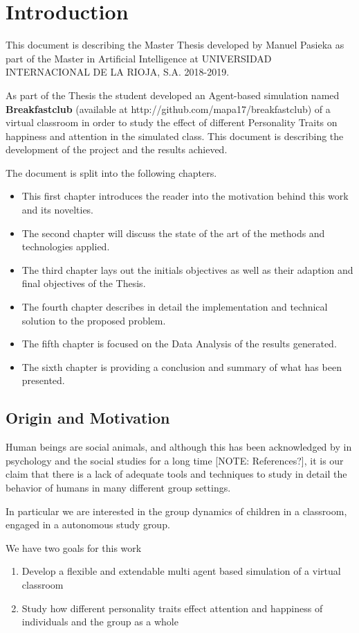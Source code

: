 \chapter{Introduction}
This document is describing the Master Thesis developed by Manuel Pasieka as part
of the Master in Artificial Intelligence at UNIVERSIDAD INTERNACIONAL DE LA RIOJA, S.A.
2018-2019. \par

\bb

As part of the Thesis the student developed an Agent-based simulation named
\textbf{Breakfastclub} (available at http://github.com/mapa17/breakfastclub) of a virtual classroom in order to study the effect of
different Personality Traits on happiness and attention in the simulated class.
This document is describing the development of the project and the results achieved.

\bb

The document is split into the following chapters.
\begin{itemize}
\item This first chapter introduces the reader into the motivation behind this work and
its novelties.
\item The second chapter will discuss the state of the art of the methods and technologies
applied.
\item The third chapter lays out the initials objectives as well as their adaption
and final objectives of the Thesis.
\item The fourth chapter describes in detail the implementation and technical solution
to the proposed problem.
\item The fifth chapter is focused on the Data Analysis of the results generated.
\item The sixth chapter is providing a conclusion and summary of what has been presented.
\end{itemize}

\section{Origin and Motivation}
Human beings are social animals, and although this has been acknowledged by
in psychology and the social studies for a long time [NOTE: References?], it is 
our claim that there is a lack of adequate tools and techniques to study in detail
the behavior of humans in many different group settings.

In particular we are interested in the group dynamics of children in a classroom,
engaged in a autonomous study group.

\bb

We have two goals for this work
\begin{enumerate}
    \item Develop a flexible and extendable multi agent based simulation of a virtual classroom
    \item Study how different personality traits effect attention and happiness of individuals and the group as a whole
\end{enumerate}
